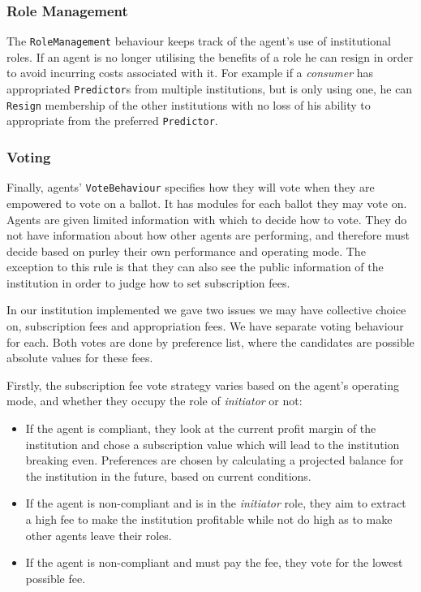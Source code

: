 \subsubsection*{Role Management}

The \texttt{RoleManagement} behaviour keeps track of the agent's use of
institutional roles. If an agent is no longer utilising the benefits of a role
he can resign in order to avoid incurring costs associated with it. For
example if a \emph{consumer} has appropriated \texttt{Predictor}s from
multiple institutions, but is only using one, he can \texttt{Resign}
membership of the other institutions with no loss of his ability to
appropriate from the preferred \texttt{Predictor}.

\subsubsection*{Voting}

Finally, agents' \texttt{VoteBehaviour} specifies how they will vote when they
are empowered to vote on a ballot. It has modules for each ballot they may
vote on. Agents are given limited information with which to decide how to
vote. They do not have information about how other agents are performing, and
therefore must decide based on purley their own performance and operating mode. The exception to
this rule is that they can also see the public information of the institution
in order to judge how to set subscription fees. 

In our institution implemented we gave two issues we may have collective
choice on, subscription fees and appropriation fees. We have separate voting
behaviour for each. Both votes are done by preference list, where the
candidates are possible absolute values for these fees.

Firstly, the subscription fee vote strategy varies based on the agent's
operating mode, and whether they occupy the role of \emph{initiator} or not:

\begin{itemize}
\item If the agent is compliant, they look at the current profit margin of the institution and chose a subscription value which will lead to the institution breaking even. Preferences are chosen by calculating a projected balance for the institution in the future, based on current conditions.
\item If the agent is non-compliant and is in the \emph{initiator} role, they aim to extract a high fee to make the institution profitable while not do high as to make other agents leave their roles.
\item If the agent is non-compliant and must pay the fee, they vote for the lowest possible fee.
\end{itemize}

